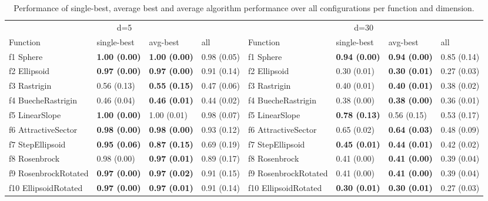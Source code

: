 \begin{table}
\caption{Performance of single-best, average best and average algorithm performance over all configurations per function and dimension.}
\begin{tabular}{llllllll}
\toprule
\multicolumn{4}{c}{d=5} & \multicolumn{4}{c}{d=30} \\
Function & single-best & avg-best & all & Function & single-best & avg-best & all \\
\midrule
f1 Sphere & \textbf{1.00 (0.00)} & \textbf{1.00 (0.00)} & 0.98 (0.05) & f1 Sphere & \textbf{0.94 (0.00)} & \textbf{0.94 (0.00)} & 0.85 (0.14) \\
f2 Ellipsoid & \textbf{0.97 (0.00)} & \textbf{0.97 (0.00)} & 0.91 (0.14) & f2 Ellipsoid & 0.30 (0.01) & \textbf{0.30 (0.01)} & 0.27 (0.03) \\
f3 Rastrigin & 0.56 (0.13) & \textbf{0.55 (0.15)} & 0.47 (0.06) & f3 Rastrigin & 0.40 (0.01) & \textbf{0.40 (0.01)} & 0.38 (0.02) \\
f4 BuecheRastrigin & 0.46 (0.04) & \textbf{0.46 (0.01)} & 0.44 (0.02) & f4 BuecheRastrigin & 0.38 (0.00) & \textbf{0.38 (0.00)} & 0.36 (0.01) \\
f5 LinearSlope & \textbf{1.00 (0.00)} & 1.00 (0.01) & 0.98 (0.07) & f5 LinearSlope & \textbf{0.78 (0.13)} & 0.56 (0.15) & 0.53 (0.17) \\
f6 AttractiveSector & \textbf{0.98 (0.00)} & \textbf{0.98 (0.00)} & 0.93 (0.12) & f6 AttractiveSector & 0.65 (0.02) & \textbf{0.64 (0.03)} & 0.48 (0.09) \\
f7 StepEllipsoid & \textbf{0.95 (0.06)} & \textbf{0.87 (0.15)} & 0.69 (0.19) & f7 StepEllipsoid & \textbf{0.45 (0.01)} & \textbf{0.44 (0.01)} & 0.42 (0.02) \\
f8 Rosenbrock & 0.98 (0.00) & \textbf{0.97 (0.01)} & 0.89 (0.17) & f8 Rosenbrock & 0.41 (0.00) & \textbf{0.41 (0.00)} & 0.39 (0.04) \\
f9 RosenbrockRotated & \textbf{0.97 (0.00)} & \textbf{0.97 (0.02)} & 0.91 (0.15) & f9 RosenbrockRotated & 0.41 (0.00) & \textbf{0.41 (0.00)} & 0.39 (0.04) \\
f10 EllipsoidRotated & \textbf{0.97 (0.00)} & \textbf{0.97 (0.01)} & 0.91 (0.14) & f10 EllipsoidRotated & \textbf{0.30 (0.01)} & \textbf{0.30 (0.01)} & 0.27 (0.03) \\

\end{tabular}
\end{table}
